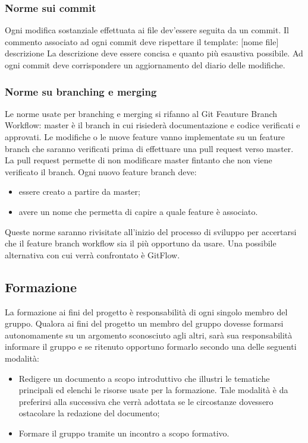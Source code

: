 \subsubsection{Norme sui commit}
Ogni modifica sostanziale effettuata ai file dev'essere seguita da un commit. Il commento associato ad ogni commit deve rispettare il template: [nome file] descrizione
La descrizione deve essere concisa e quanto più esaustiva possibile. Ad ogni commit deve corrispondere un aggiornamento del diario delle modifiche.

\subsubsection{Norme su branching e merging}
Le norme usate per branching e merging si rifanno al Git Feauture Branch Workflow:
master è il branch in cui risiederà documentazione e codice verificati e approvati.
Le modifiche o le nuove feature vanno implementate su un feature branch che saranno verificati
prima di effettuare una pull request verso master.
La pull request permette di non modificare master fintanto che non viene verificato il branch.
Ogni nuovo feature branch deve:
\begin{itemize}
\item essere creato a partire da master;
\item avere un nome che permetta di capire a quale feature è associato.
\end{itemize}
Queste norme saranno rivisitate all'inizio del processo di sviluppo per accertarsi che il feature branch workflow
sia il più opportuno da usare. Una possibile alternativa con cui verrà confrontato è GitFlow.

\subsection{Formazione}
La formazione ai fini del progetto è responsabilità di ogni singolo membro del gruppo. Qualora ai fini del progetto un membro del gruppo dovesse formarsi autonomamente su un argomento sconosciuto agli altri, sarà sua responsabilità informare il gruppo e se ritenuto opportuno formarlo secondo una delle seguenti modalità:
\begin{itemize}
\item Redigere un documento a scopo introduttivo che illustri le tematiche principali ed
elenchi le risorse usate per la formazione. Tale modalità è da preferirsi alla successiva che verrà adottata se le circostanze dovessero ostacolare la redazione del documento;
\item Formare il gruppo tramite un incontro a scopo formativo.
\end{itemize}
\pagebreak
